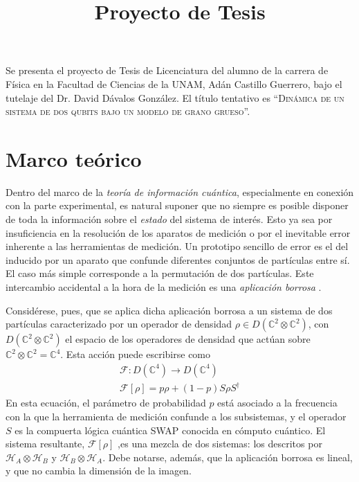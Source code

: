 \documentclass[onecolumn,11pt]{article}
\title{Proyecto de Tesis} \date{}
\newcommand{\mcH}{\mathcal{H}}
\newcommand{\mcF}{\mathcal{F}}
\newcommand{\Complex}{\mathbb{C}} %
\newcommand{\Fuzzy}[1]{\mcF\left[#1\right]}
\begin{document}
\maketitle
\thispagestyle{empty}
Se presenta el proyecto de Tesis de Licenciatura del alumno de la carrera de Física en la Facultad de Ciencias de la UNAM, Adán Castillo Guerrero, bajo el tutelaje del Dr. David Dávalos González. El título tentativo es ``\textsc{Dinámica de un sistema de dos qubits bajo un modelo de grano grueso}''.

\section{Marco teórico}


Dentro del marco de la \textit{teoría de información cuántica}, especialmente en conexión con la parte experimental, es natural suponer que no siempre es posible disponer de toda la información sobre el \textit{estado} del sistema de interés. Esto ya sea por insuficiencia en la resolución de los aparatos de medición o por el inevitable error inherente a las herramientas de medición. Un prototipo sencillo de error es el del inducido por un aparato que confunde diferentes conjuntos de partículas entre sí. El caso más simple corresponde a la permutación de dos partículas. Este intercambio accidental a la hora de la medición es una \textit{aplicación borrosa} \cite{FuzzyMeasurements}.

Considérese, pues, que se aplica dicha aplicación borrosa a un sistema de dos partículas caracterizado por un operador de densidad $\rho\in D(\Complex^{2}\otimes\Complex^{2})$, con $D(\Complex^{2}\otimes\Complex^{2})$ el espacio de los operadores de densidad que actúan sobre $\Complex^{2}\otimes\Complex^{2}=\Complex^{4}$. Esta acción puede escribirse como
\begin{gather}
\mcF:D(\Complex^{4})\rightarrow D(\Complex^{4})\label{eq:Fuzzy2Domain}\\
\Fuzzy{\rho}=p\rho+(1-p)S\rho S^{\dag}\label{eq:Fuzzy2}
\end{gather}
En esta ecuación, el parámetro  de probabilidad $p$ está asociado a la frecuencia con la que la herramienta de medición confunde a los subsistemas, y el operador $S$ es la compuerta lógica cuántica SWAP conocida en cómputo cuántico. El sistema resultante, $\Fuzzy{\rho}$ ,es una mezcla de dos sistemas: los descritos por $\mcH_{A}\otimes\mcH_{B}$ y $\mcH_{B}\otimes\mcH_{A}$. Debe notarse, además, que la aplicación borrosa es lineal, y que no cambia la dimensión de la imagen.
\end{document}
